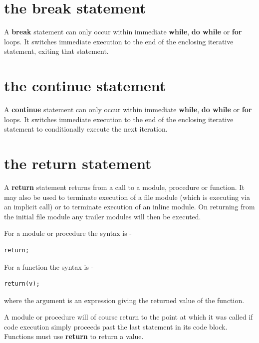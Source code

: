     \section{the {\bf break} statement}\label{sec:im_break_statement}

        A {\bf break} statement can only occur within immediate {\bf while},
        {\bf do while} or {\bf for} loops. It switches immediate execution to
        the end of the enclosing iterative statement, exiting that statement.



    \section{the {\bf continue} statement}\label{sec:im_continue_statement}

        A {\bf continue} statement can only occur within immediate {\bf while},
        {\bf do while} or {\bf for} loops. It switches immediate execution to
        the end of the enclosing iterative statement to conditionally execute
        the next iteration.



    \section{the {\bf return} statement}\label{sec:im_return_statement}

        A {\bf return} statement returns from a call to a module, procedure
        or function. It may also be used to terminate execution of a file module
        (which is executing via an implicit call) or to terminate execution
        of an inline module. On returning from the initial file module any
        trailer modules will then be executed.

        For a module or procedure the syntax is -
        \begin{lstlisting}[gobble=8, language=threepl]
               return;
        \end{lstlisting}
        For a function the syntax is -
        \begin{lstlisting}[gobble=8, language=threepl]
               return(v);
        \end{lstlisting}
        where the argument is an expression giving the returned value of the
        function.
        
        A module or procedure will of course return to the point
        at which it was called if code execution simply proceeds past the
        last statement in its code block. Functions must use {\bf return}
        to return a value.
        

